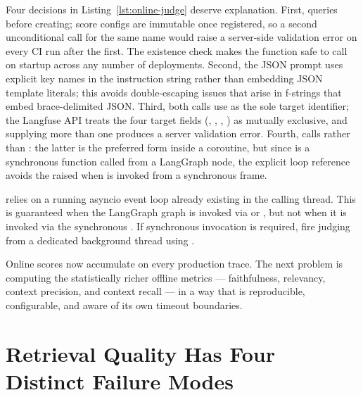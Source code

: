 Four decisions in Listing~\ref{lst:online-judge} deserve explanation.
First,  queries 
before creating; score configs are immutable once registered, so a second
unconditional  call for the same name would raise a server-side
validation error on every CI run after the first.  The existence check makes
the function safe to call on startup across any number of deployments.
Second, the JSON prompt uses explicit key names in the instruction string
rather than embedding JSON template literals; this avoids double-escaping
issues that arise in f-strings that embed brace-delimited JSON.  Third, both
 calls use  as the sole target
identifier; the Langfuse API treats the four target fields
(, , ,
) as mutually exclusive, and supplying more than one
produces a server validation error.  Fourth, 
calls  rather than
: the latter is the preferred form inside a
coroutine, but since  is a synchronous function
called from a LangGraph node, the explicit loop reference avoids the
 raised when  is invoked from a
synchronous frame.

\begin{warningbox}
 relies on a running asyncio event loop already
existing in the calling thread.  This is guaranteed when the LangGraph graph
is invoked via  or , but not when it is invoked
via the synchronous .  If synchronous invocation is required,
fire judging from a dedicated background thread using
.
\end{warningbox}

Online scores now accumulate on every production trace.  The next problem
is computing the statistically richer offline metrics --- faithfulness,
relevancy, context precision, and context recall --- in a way that is
reproducible, configurable, and aware of its own timeout boundaries.

\section{Retrieval Quality Has Four Distinct Failure Modes}
\label{sec:ragas-metrics}

